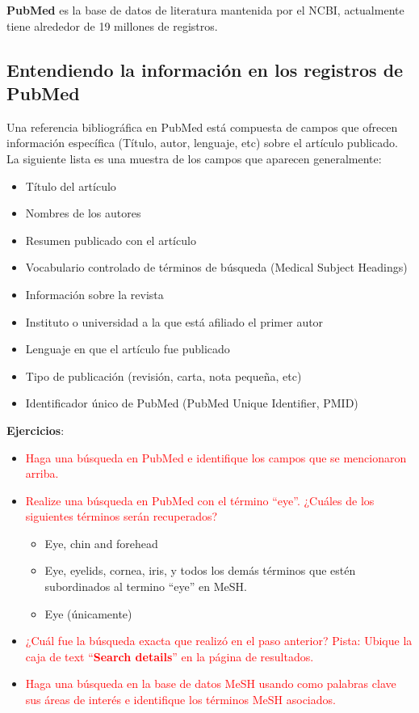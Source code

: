 \documentclass[letter,11pt]{book}
\begin{document}
\textbf{PubMed} es la base de datos de literatura mantenida por el NCBI, actualmente tiene alrededor de 19 millones de registros.

\subsection{Entendiendo la información en los registros de PubMed}

Una referencia bibliográfica en PubMed está compuesta de campos que ofrecen información específica (Título, autor, lenguaje, etc) sobre el artículo publicado. La siguiente lista es una muestra de los campos que aparecen generalmente:

\begin{itemize}
\item Título del artículo
\item Nombres de los autores
\item Resumen publicado con el artículo
\item Vocabulario controlado de términos de búsqueda (Medical Subject Headings)
\item Información sobre la revista
\item Instituto o universidad a la que está afiliado el primer autor
\item Lenguaje en que el artículo fue publicado
\item Tipo de publicación (revisión, carta, nota pequeña, etc)
\item Identificador único de PubMed (PubMed Unique Identifier, PMID)
\end{itemize}

\textbf{Ejercicios}:

\begin{itemize}
\item \textcolor{red}{Haga una búsqueda en PubMed e identifique los campos que se mencionaron arriba.}
\item \textcolor{red}{Realize una búsqueda en PubMed con el término ``eye''. ¿Cuáles de los siguientes términos serán recuperados?}
 \begin{itemize}
  \item Eye, chin and forehead
  \item Eye, eyelids, cornea, iris, y todos los demás términos que estén subordinados al termino ``eye'' en MeSH.
   \item Eye (únicamente)
 \end{itemize}
 \item \textcolor{red}{¿Cuál fue la búsqueda exacta que realizó en el paso anterior? Pista: Ubique la caja de text ``\textbf{Search details}'' en la página de resultados.}
 \item \textcolor{red}{Haga una búsqueda en la base de datos MeSH usando como palabras clave sus áreas de interés e identifique los términos MeSH asociados.}
\end{itemize}
\end{document}
